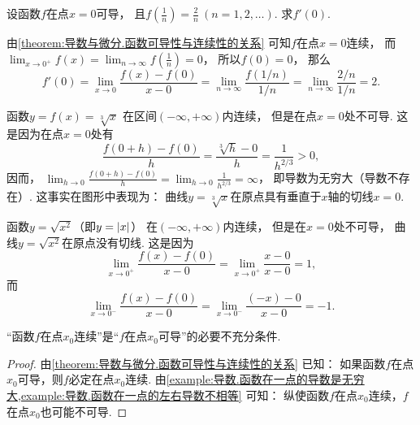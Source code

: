 \begin{example}
设函数\(f\)在点\(x=0\)可导，
且\(f\left( \frac1n \right) = \frac2n\ (n=1,2,\dotsc)\).
求\(f'(0)\).
\begin{solution}
由\cref{theorem:导数与微分.函数可导性与连续性的关系} 可知\(f\)在点\(x=0\)连续，
而\(\lim_{x\to0^+} f(x)
= \lim_{n\to\infty} f\left( \frac1n \right)
= 0\)，
所以\(f(0) = 0\)，
那么\begin{equation*}
	f'(0) = \lim_{x\to0} \frac{f(x) - f(0)}{x - 0}
	= \lim_{n\to\infty} \frac{f(1/n)}{1/n}
	= \lim_{n\to\infty} \frac{2/n}{1/n}
	= 2.
\end{equation*}
\end{solution}
\end{example}

\begin{example}\label{example:导数.函数在一点的导数是无穷大}
函数\(y=f(x)=\sqrt[3]x\)
在区间\((-\infty,+\infty)\)内连续，
但是在点\(x=0\)处不可导.
这是因为在点\(x=0\)处有\begin{equation*}
	\frac{f(0+h)-f(0)}{h}
	=\frac{\sqrt[3]{h}-0}{h}
	=\frac{1}{h^{2/3}}>0,
\end{equation*}
因而，
\(\lim_{h\to0} \frac{f(0+h)-f(0)}{h}
=\lim_{h\to0} \frac{1}{h^{2/3}}
=\infty\)，
即导数为无穷大（导数不存在）.
这事实在图形中表现为：
曲线\(y=\sqrt[3]x\)在原点具有垂直于\(x\)轴的切线\(x=0\).
\end{example}

\begin{example}\label{example:导数.函数在一点的左右导数不相等}
函数\(y=\sqrt{x^2}\)（即\(y=\abs{x}\)）
在\((-\infty,+\infty)\)内连续，
但是在\(x=0\)处不可导，
曲线\(y=\sqrt{x^2}\)在原点没有切线.
这是因为\begin{equation*}
	\lim_{x\to0^+} \frac{f(x)-f(0)}{x-0}
	= \lim_{x\to0^+} \frac{x-0}{x-0}
	= 1,
\end{equation*}
而\begin{equation*}
	\lim_{x\to0^-} \frac{f(x)-f(0)}{x-0}
	= \lim_{x\to0^-} \frac{(-x)-0}{x-0}
	= -1.
\end{equation*}
\end{example}

\begin{theorem}
“函数\(f\)在点\(x_0\)连续”是“\(f\)在点\(x_0\)可导”的必要不充分条件.
\begin{proof}
由\cref{theorem:导数与微分.函数可导性与连续性的关系} 已知：
如果函数\(f\)在点\(x_0\)可导，则\(f\)必定在点\(x_0\)连续.
由\cref{example:导数.函数在一点的导数是无穷大,example:导数.函数在一点的左右导数不相等} 可知：
纵使函数\(f\)在点\(x_0\)连续，\(f\)在点\(x_0\)也可能不可导.
\end{proof}
\end{theorem}

